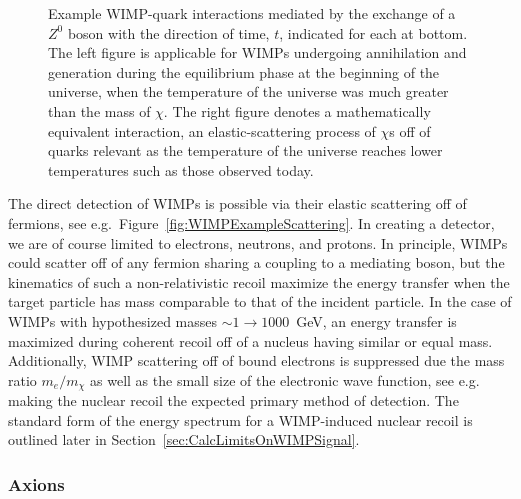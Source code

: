 			\begin{figure}
				\centering
				\def\figheight{0.4\textwidth}
				\caption[Relevant WIMP-quark interactions during hot and cold universe epochs.]{Example WIMP-quark 
				interactions mediated by the exchange of a $Z^{0}$ boson with the direction
				of time, $t$, indicated for each at bottom.  The left figure is applicable for WIMPs undergoing annihilation and 
				generation during the equilibrium phase at
				the beginning of the universe, when the temperature of the universe was much greater than the mass of $\chi$.
				The right figure denotes a mathematically equivalent interaction, an elastic-scattering process
				of $\chi$s off of quarks relevant as the temperature of the universe reaches lower temperatures such as 
				those observed today.}
				\label{fig:WIMPExample}
			\end{figure}	
			
	The direct detection of WIMPs is possible via their elastic scattering off of fermions, see e.g.~Figure~\ref{fig:WIMPExampleScattering}.  In creating a detector, we are of course limited to electrons, neutrons, and protons.  In principle, WIMPs could scatter off of any fermion sharing a coupling to a mediating boson, but the kinematics of such a non-relativistic recoil maximize the energy transfer when the target particle has mass comparable to that of the incident particle.  In the case of WIMPs with hypothesized masses $\sim1\to1000$~GeV, an energy transfer is maximized during coherent recoil off of a nucleus having similar or equal mass.  Additionally, WIMP scattering off of bound electrons is suppressed due the mass ratio $m_{e}/m_{\chi}$ as well as the small size of the electronic wave function, see e.g.~\cite{Kopp09} making the nuclear recoil the expected primary method of detection.  The standard form of the energy spectrum for a WIMP-induced nuclear recoil is outlined later in Section~\ref{sec:CalcLimitsOnWIMPSignal}.
	
			\subsubsection{Axions}
	
